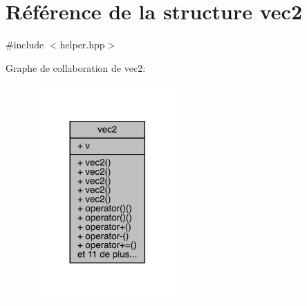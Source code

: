\hypertarget{structvec2}{\section{Référence de la structure vec2}
\label{structvec2}
}


{\ttfamily \#include $<$helper.\+hpp$>$}



Graphe de collaboration de vec2\+:
\nopagebreak
\begin{figure}[H]
\begin{center}
\leavevmode
\includegraphics[width=161pt]{structvec2__coll__graph}
\end{center}
\end{figure}
